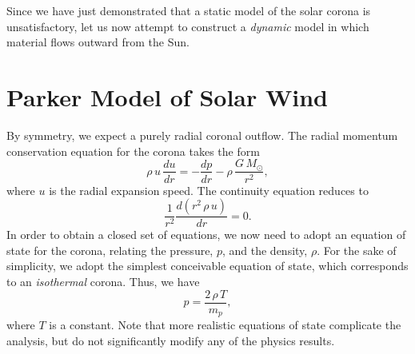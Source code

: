 Since we have just demonstrated that a static model of the solar corona is
unsatisfactory, let us now attempt to construct a {\em dynamic}\/ model
in which material flows outward from the Sun. 

\section{Parker Model of  Solar Wind}
By symmetry, we expect a purely radial coronal outflow.
The radial momentum conservation equation for the corona takes the form
\begin{equation}\label{e5.46}
\rho\,u\,\frac{du}{dr} = -\frac{dp}{dr} - \rho\,\frac{G\,M_\odot}{r^2},
\end{equation}
where $u$ is the radial expansion speed. 
The continuity equation reduces to
\begin{equation}\label{e5.47}
\frac{1}{r^2}\frac{d(r^2\,\rho\,u)}{dr} = 0.
\end{equation}
In order to obtain a closed set of equations, we now need to adopt an equation
of state for the corona, relating the pressure, $p$, and the density, $\rho$. For
the  sake of simplicity, we adopt the simplest conceivable equation
of state, which corresponds to an {\em isothermal}\/ corona. Thus,
we have
\begin{equation}\label{e5.48}
p = \frac{2\,\rho\,T}{m_p},
\end{equation}
where $T$ is a constant. Note that more realistic
equations of state complicate the analysis, but do not significantly modify
any of the physics results.

